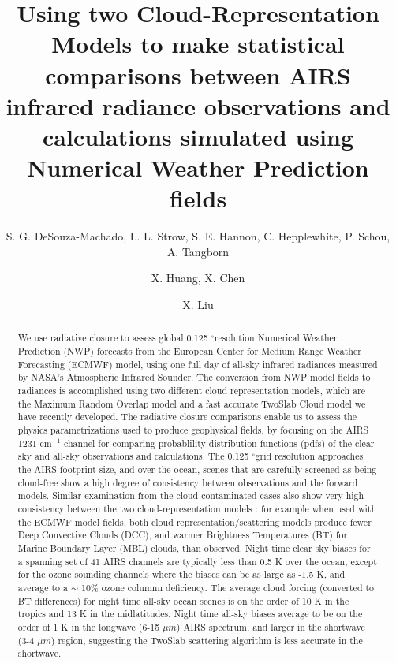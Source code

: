 \documentclass[agupp]{aguplus}              %
\newcommand{\wn}{cm$^{-1}$\xspace}
\newcommand{\um}{$\mu m$\xspace}
\newcommand{\mydeg}{\mbox{$^\circ$}}
\begin{document}
\title{Using two Cloud-Representation Models to make statistical comparisons
between AIRS infrared radiance observations and calculations simulated using
Numerical Weather Prediction fields}

\author{S. G. DeSouza-Machado, L. L. Strow, S. E. Hannon, C. Hepplewhite, \newline P. Schou, A. Tangborn}
\author{X. Huang, X. Chen} 
\author{X. Liu} 

\begin{abstract}
\small 

We use radiative closure to assess global 0.125 \mydeg resolution
Numerical Weather Prediction (NWP) forecasts from the European Center
for Medium Range Weather Forecasting (ECMWF) model, using one full day
of all-sky infrared radiances measured by NASA's Atmospheric Infrared
Sounder. The conversion from NWP model fields to radiances is
accomplished using two different cloud representation models, which
are the Maximum Random Overlap model and a fast accurate TwoSlab Cloud
model we have recently developed. The radiative closure comparisons
enable us to assess the physics parametrizations used to produce
geophysical fields, by focusing on the AIRS 1231 \wn channel for
comparing probablility distribution functions (pdfs) of the clear-sky
and all-sky observations and calculations. The 0.125 \mydeg grid
resolution approaches the AIRS footprint size, and over the ocean,
scenes that are carefully screened as being cloud-free show a high
degree of consistency between observations and the forward
models. Similar examination from the cloud-contaminated cases also
show very high consistency between the two cloud-representation models
: for example when used with the ECMWF model fields, both cloud
representation/scattering models produce fewer Deep Convective Clouds
(DCC), and warmer Brightness Temperatures (BT) for Marine Boundary
Layer (MBL) clouds, than observed. Night time clear sky biases for a
spanning set of 41 AIRS channels are typically less than 0.5 K over
the ocean, except for the ozone sounding channels where the biases can
be as large as -1.5 K, and average to a $\sim$ 10\% ozone columnn
deficiency. The average cloud forcing (converted to BT differences)
for night time all-sky ocean scenes is on the order of 10 K in the
tropics and 13 K in the midlatitudes. Night time all-sky biases
average to be on the order of 1 K in the longwave (6-15 \um) AIRS
spectrum, and larger in the shortwave (3-4 \um) region, suggesting the
TwoSlab scattering algorithm is less accurate in the shortwave.

\end{abstract}
\end{document}
